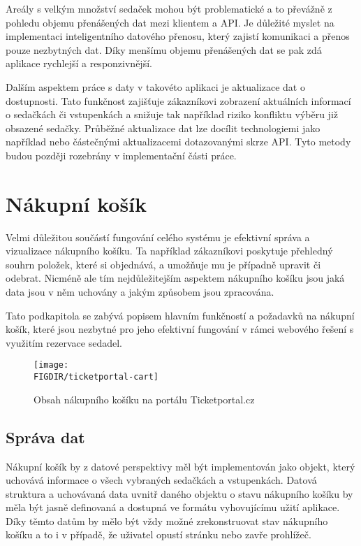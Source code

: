 Areály s velkým množství sedaček mohou být problematické a to převážně z pohledu objemu přenášených dat mezi klientem a API.
Je důležité myslet na implementaci inteligentního datového přenosu, který zajistí komunikaci a přenos pouze nezbytných dat.
Díky menšímu objemu přenášených dat se pak zdá aplikace rychlejší a responzivnější.

Dalším aspektem práce s daty v takovéto aplikaci je aktualizace dat o dostupnosti.
Tato funkčnost zajišťuje zákazníkovi zobrazení aktuálních informací o sedačkách či vstupenkách a snižuje tak například riziko konfliktu výběru již obsazené sedačky.
Průběžné aktualizace dat lze docílit technologiemi jako například  nebo částečnými aktualizacemi dotazovanými skrze API.
Tyto metody budou později rozebrány v implementační části práce.


\section{Nákupní košík}
\label{sec:specifikace-nakupni-kosik}
Velmi důležitou součástí fungování celého systému je efektivní správa a vizualizace nákupního košíku.
Ta například zákazníkovi poskytuje přehledný souhrn položek, které si objednává, a umožňuje mu je případně upravit či odebrat.
Nicméně ale tím nejdůležitejším aspektem nákupního košíku jsou jaká data jsou v něm uchovány a jakým způsobem jsou zpracována.

Tato podkapitola se zabývá popisem hlavním funkčností a požadavků na nákupní košík, které jsou nezbytné pro jeho efektivní fungování v rámci webového řešení s využitím rezervace sedadel.

\begin{figure}[H]
    \texttt{[image: \\FIGDIR/ticketportal-cart]}
    \centering
    \caption{Obsah nákupního košíku na portálu Ticketportal.cz}
    \label{fig:ticketportal-cart}
\end{figure}

\subsection{Správa dat}
\label{sec:specifikace-nakupni-kosik-sprava}
Nákupní košík by z datové perspektivy měl být implementován jako objekt, který uchovává informace o všech vybraných sedačkách a vstupenkách.
Datová struktura a uchovávaná data uvnitř daného objektu o stavu nákupního košíku by měla být jasně definovaná a dostupná ve formátu vyhovujícímu užití aplikace.
Díky těmto datům by mělo být vždy možné zrekonstruovat stav nákupního košíku a to i v případě, že uživatel opustí stránku nebo zavře prohlížeč.

